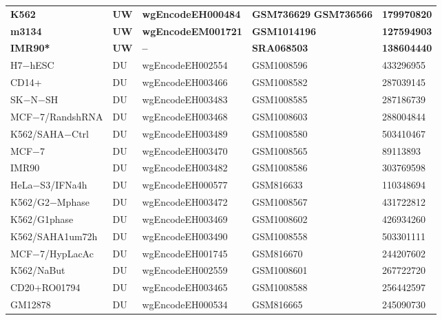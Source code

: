\documentclass[11pt]{article}
\begin{document}
\begin{longtable}{p{3.5cm}p{1cm}p{4cm}p{2.8cm}p{3cm}}
\textbf{K562} & \textbf{UW} & \textbf{wgEncodeEH000484} & \textbf{GSM736629} \newline \textbf{GSM736566} & \textbf{179970820} \\
\textbf{m3134} & \textbf{UW} & \textbf{wgEncodeEM001721} & \textbf{GSM1014196} & \textbf{127594903} \\
\textbf{IMR90*} & \textbf{UW} & \textbf{--}    & \textbf{SRA068503} & \textbf{138604440} \\
H7−hESC & DU & wgEncodeEH002554 & GSM1008596 & 433296955 \\
CD14+ & DU & wgEncodeEH003466 & GSM1008582 & 287039145 \\
SK−N−SH & DU & wgEncodeEH003483 & GSM1008585 & 287186739 \\
MCF−7/RandshRNA & DU & wgEncodeEH003468 & GSM1008603 & 288004844 \\
K562/SAHA−Ctrl & DU & wgEncodeEH003489 & GSM1008580 & 503410467 \\
MCF−7 & DU & wgEncodeEH003470 & GSM1008565 & 89113893 \\
IMR90 & DU & wgEncodeEH003482 & GSM1008586 & 303769598 \\
HeLa−S3/IFNa4h & DU & wgEncodeEH000577 & GSM816633 & 110348694 \\
K562/G2−Mphase & DU & wgEncodeEH003472 & GSM1008567 & 431722812 \\
K562/G1phase & DU & wgEncodeEH003469 & GSM1008602 & 426934260 \\
K562/SAHA1um72h & DU & wgEncodeEH003490 & GSM1008558 & 503301111 \\
MCF−7/HypLacAc & DU & wgEncodeEH001745 & GSM816670 & 244207602 \\
K562/NaBut & DU & wgEncodeEH002559 & GSM1008601 & 267722720 \\
CD20+RO01794 & DU & wgEncodeEH003465 & GSM1008588 & 256442597 \\
GM12878 & DU & wgEncodeEH000534 & GSM816665 & 245090730 \\

\end{longtable}
\end{document}
